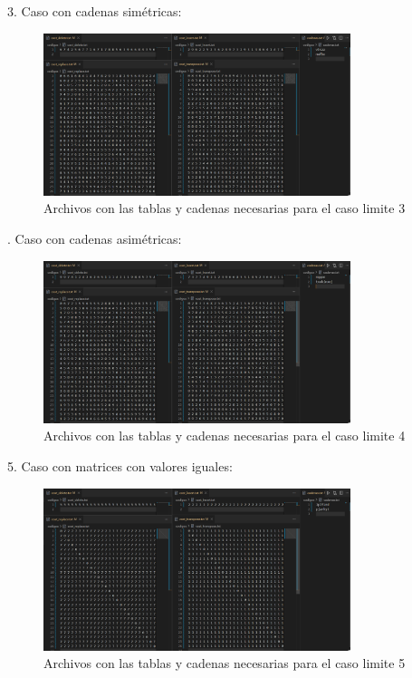 3. Caso con cadenas simétricas:\\
\begin{figure}[ht]
  \centering
  \includegraphics[width=0.8\textwidth]{./images/Casos3.png}
  \caption{Archivos con las tablas y cadenas necesarias para el caso limite 3}
  \label{fig:imagen}
\end{figure}
. Caso con cadenas asimétricas:\\
\begin{figure}[ht]
  \centering
  \includegraphics[width=0.8\textwidth]{./images/Casos4.png}
  \caption{Archivos con las tablas y cadenas necesarias para el caso limite 4}
  \label{fig:imagen}
\end{figure}

5. Caso con matrices con valores iguales:\\
\begin{figure}[ht]
  \centering
  \includegraphics[width=0.8\textwidth]{./images/Casos5.png}
  \caption{Archivos con las tablas y cadenas necesarias para el caso limite 5}
  \label{fig:imagen}
\end{figure}
\newpage